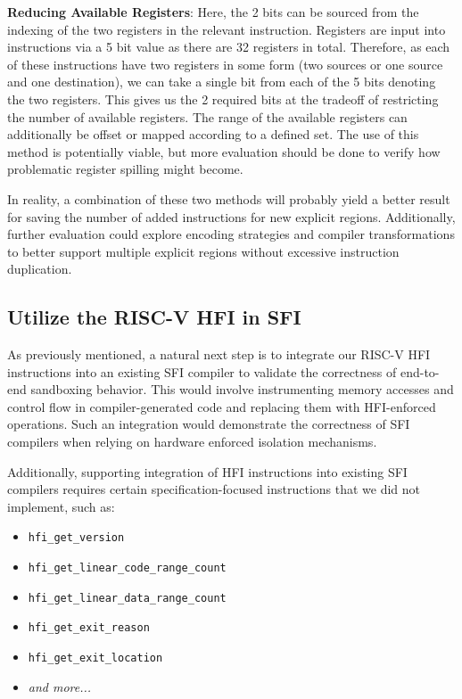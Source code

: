 \documentclass[conference,compsoc]{IEEEtran}
\begin{document}
\textbf{Reducing Available Registers}:
Here, the 2 bits can be sourced from the indexing of the two registers in the relevant instruction. 
Registers are input into instructions via a 5 bit value as there are 32 registers in total.
Therefore, as each of these instructions have two registers in some form (two sources or one source and one destination), 
we can take a single bit from each of the 5 bits denoting the two registers. 
This gives us the 2 required bits at the tradeoff of restricting the number of available registers.
The range of the available registers can additionally be offset or mapped according to a defined set. 
The use of this method is potentially viable, but more evaluation should be done to verify how problematic register spilling might become.

In reality, a combination of these two methods will probably yield a better result for saving the number of added instructions for new explicit regions.
Additionally, further evaluation could explore encoding strategies and compiler transformations to better support multiple explicit regions without excessive instruction duplication.
  
\subsection{Utilize the RISC-V HFI in SFI}
As previously mentioned, a natural next step is to integrate our RISC-V HFI instructions into an existing SFI compiler to validate the correctness of end-to-end sandboxing behavior. 
This would involve instrumenting memory accesses and control flow in compiler-generated code and replacing them with HFI-enforced operations. 
Such an integration would demonstrate the correctness of SFI compilers when relying on hardware enforced isolation mechanisms.

Additionally, supporting integration of HFI instructions into existing SFI compilers requires certain specification-focused instructions that we did not implement, such as:

\begin{itemize}
  \item \texttt{hfi\_get\_version}
  \item \texttt{hfi\_get\_linear\_code\_range\_count}
  \item \texttt{hfi\_get\_linear\_data\_range\_count}
  \item \texttt{hfi\_get\_exit\_reason}
  \item \texttt{hfi\_get\_exit\_location}
  \item \textit{and more...}
\end{itemize}
\end{document}
